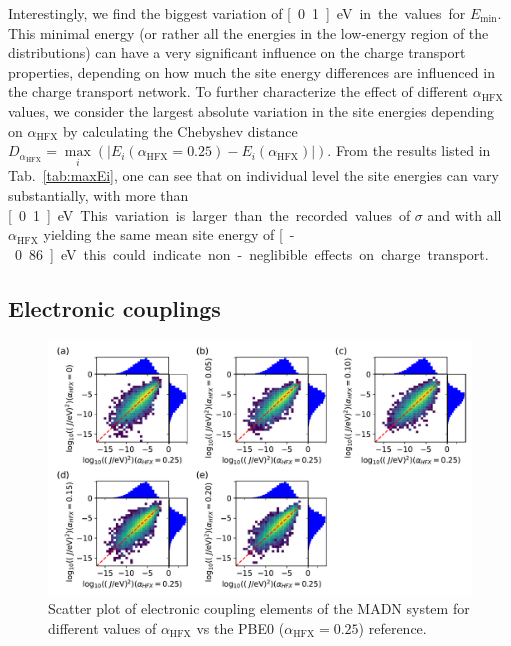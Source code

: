 \documentclass[%
 reprint,
superscriptaddress,
 amsmath,amssymb,
 aps,
prb,
floatfix
]{revtex4-2}
\newcommand{\ahfx}{\ensuremath{\alpha_\text{HFX}}\xspace}
\begin{document}
Interestingly, we find the biggest variation of \unit[0.1]{eV} in the values for $E_\text{min}$. This minimal energy (or rather all the energies in the low-energy region of the distributions) can have a very significant influence on the charge transport properties, depending on how much the site energy differences are influenced in the charge transport network. To further characterize the effect of different \ahfx values, we consider the largest absolute variation in the site energies depending on \ahfx by calculating the Chebyshev distance $D_{\ahfx} = \max\limits_{i}(|E_i(\ahfx=0.25) - E_i(\ahfx)|)$. From the results listed in Tab.~\ref{tab:maxEi}, one can see that on individual level the site energies can vary substantially, with more than \unit[0.1]{eV}. This variation is larger than the recorded values of $\sigma$ and with all \ahfx yielding the same mean site energy of \unit[-0.86]{eV} this could indicate non-neglibible effects on charge transport. 

\subsection{Electronic couplings}

\begin{figure}[tbp]
  \centering
  \includegraphics[width=\linewidth]{figs/scatterJ_all.pdf}
  \caption{Scatter plot of electronic coupling elements of the MADN system for different values of \ahfx vs the PBE0 ($\ahfx=0.25$) reference.}
  \label{fig:J_MADN}
\end{figure}
\end{document}
